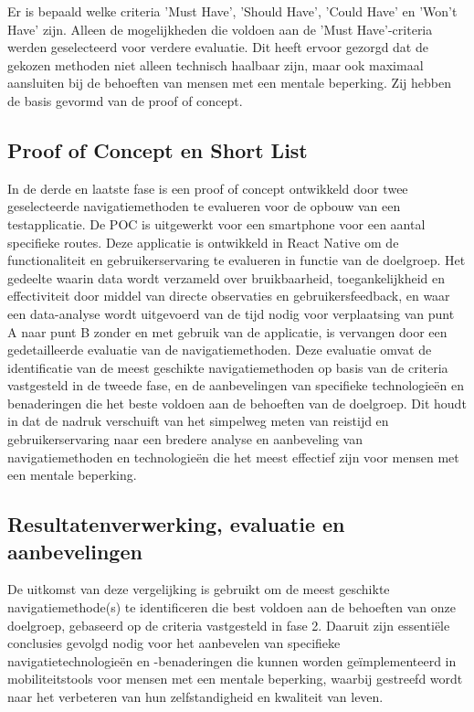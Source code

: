 Er is bepaald welke criteria 'Must Have', 'Should Have', 'Could Have' en 'Won't Have' zijn. Alleen de mogelijkheden die voldoen aan de 'Must Have'-criteria werden geselecteerd voor verdere evaluatie. Dit heeft ervoor gezorgd dat de gekozen methoden niet alleen technisch haalbaar zijn, maar ook maximaal aansluiten bij de behoeften van mensen met een mentale beperking. Zij hebben de basis gevormd van de proof of concept.

\subsection*{Proof of Concept en Short List}

In de derde en laatste fase is een proof of concept ontwikkeld door twee geselecteerde navigatiemethoden te evalueren voor de opbouw van een testapplicatie. De POC is uitgewerkt voor een smartphone voor een aantal specifieke routes. Deze applicatie is ontwikkeld in React Native om de functionaliteit en gebruikerservaring te evalueren in functie van de doelgroep. Het gedeelte waarin data wordt verzameld over bruikbaarheid, toegankelijkheid en effectiviteit door middel van directe observaties en gebruikersfeedback, en waar een data-analyse wordt uitgevoerd van de tijd nodig voor verplaatsing van punt A naar punt B zonder en met gebruik van de applicatie, is vervangen door een gedetailleerde evaluatie van de navigatiemethoden. Deze evaluatie omvat de identificatie van de meest geschikte navigatiemethoden op basis van de criteria vastgesteld in de tweede fase, en de aanbevelingen van specifieke technologieën en benaderingen die het beste voldoen aan de behoeften van de doelgroep. Dit houdt in dat de nadruk verschuift van het simpelweg meten van reistijd en gebruikerservaring naar een bredere analyse en aanbeveling van navigatiemethoden en technologieën die het meest effectief zijn voor mensen met een mentale beperking.

\subsection*{Resultatenverwerking, evaluatie en aanbevelingen}

De uitkomst van deze vergelijking is gebruikt om de meest geschikte navigatiemethode(s) te identificeren die best voldoen aan de behoeften van onze doelgroep, gebaseerd op de criteria vastgesteld in fase 2. Daaruit zijn essentiële conclusies gevolgd nodig voor het aanbevelen van specifieke navigatietechnologieën en -benaderingen die kunnen worden geïmplementeerd in mobiliteitstools voor mensen met een mentale beperking, waarbij gestreefd wordt naar het verbeteren van hun zelfstandigheid en kwaliteit van leven.